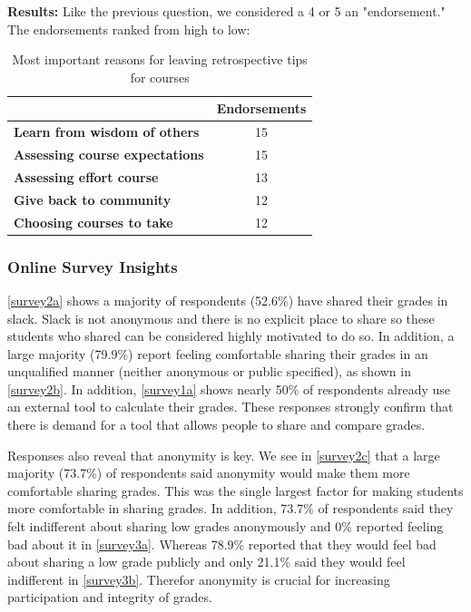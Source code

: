 \textbf{Results:} Like the previous question, we considered a 4 or 5 an "endorsement." The endorsements ranked from high to low:

\begin{table}[H]
\centering
\begin{tabular}{@{}lc@{}}
\toprule
                  & {\textbf{Endorsements}}  \\ \midrule
\textbf{Learn from wisdom of others}    & 15    \\
\textbf{Assessing course expectations}     & 15 \\
\textbf{Assessing effort course}     & 13 \\
\textbf{Give back to community}     & 12 \\
\textbf{Choosing courses to take}     & 12 \\ \bottomrule
\end{tabular}
\caption{Most important reasons for leaving retrospective tips for courses}
\label{survey5a}
\end{table}

\subsubsection{Online Survey Insights}
\autoref{survey2a} shows a majority of respondents (52.6\%) have shared their grades in slack. Slack is not anonymous and there is no explicit place to share so these students who shared can be considered highly motivated to do so. In addition, a large majority (79.9\%) report feeling comfortable sharing their grades in an unqualified manner (neither anonymous or public specified), as shown in \autoref{survey2b}. In addition, \autoref{survey1a} shows nearly 50\% of respondents already use an external tool to calculate their grades. These responses strongly confirm that there is demand for a tool that allows people to share and compare grades.

Responses also reveal that anonymity is key. We see in \autoref{survey2c} that a large majority (73.7\%) of respondents said anonymity would make them more comfortable sharing grades. This was the single largest factor for making students more comfortable in sharing grades. In addition, 73.7\% of respondents said they felt indifferent about sharing low grades anonymously and 0\% reported feeling bad about it in \autoref{survey3a}. Whereas 78.9\% reported that they would feel bad about sharing a low grade publicly and only 21.1\% said they would feel indifferent in \autoref{survey3b}. Therefor anonymity is crucial for increasing participation and integrity of grades.

